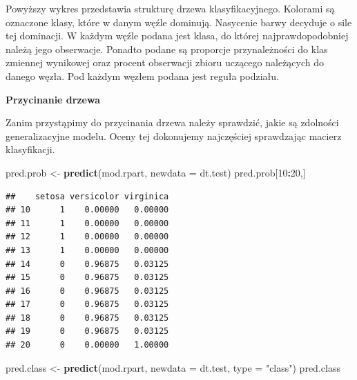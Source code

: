 \documentclass[]{book}
\newenvironment{Shaded}{\begin{snugshade}}{\end{snugshade}}
\newcommand{\DataTypeTok}[1]{\textcolor[rgb]{0.13,0.29,0.53}{#1}}
\newcommand{\DecValTok}[1]{\textcolor[rgb]{0.00,0.00,0.81}{#1}}
\newcommand{\KeywordTok}[1]{\textcolor[rgb]{0.13,0.29,0.53}{\textbf{#1}}}
\newcommand{\NormalTok}[1]{#1}
\newcommand{\OperatorTok}[1]{\textcolor[rgb]{0.81,0.36,0.00}{\textbf{#1}}}
\newcommand{\StringTok}[1]{\textcolor[rgb]{0.31,0.60,0.02}{#1}}
\theoremstyle{plain}
\theoremstyle{definition}
\theoremstyle{definition}
\theoremstyle{definition}
\theoremstyle{definition}
\theoremstyle{remark}
\begin{document}
Powyższy wykres przedstawia strukturę drzewa klasyfikacyjnego. Kolorami są oznaczone klasy, które w danym węźle dominują. Nasycenie barwy decyduje o sile tej dominacji. W każdym węźle podana jest klasa, do której najprawdopodobniej należą jego obserwacje. Ponadto podane są proporcje przynależności do klas zmiennej wynikowej oraz procent obserwacji zbioru uczącego należących do danego węzła. Pod każdym węzłem podana jest reguła podziału.

\textbf{Przycinanie drzewa}

Zanim przystąpimy do przycinania drzewa należy sprawdzić, jakie są zdolności generalizacyjne modelu. Oceny tej dokonujemy najczęściej sprawdzając macierz klasyfikacji.

\begin{Shaded}
\begin{Highlighting}[]
\NormalTok{pred.prob <-}\StringTok{ }\KeywordTok{predict}\NormalTok{(mod.rpart, }
                     \DataTypeTok{newdata =}\NormalTok{ dt.test)}
\NormalTok{pred.prob[}\DecValTok{10}\OperatorTok{:}\DecValTok{20}\NormalTok{,]}
\end{Highlighting}
\end{Shaded}

\begin{verbatim}
##    setosa versicolor virginica
## 10      1    0.00000   0.00000
## 11      1    0.00000   0.00000
## 12      1    0.00000   0.00000
## 13      1    0.00000   0.00000
## 14      0    0.96875   0.03125
## 15      0    0.96875   0.03125
## 16      0    0.96875   0.03125
## 17      0    0.96875   0.03125
## 18      0    0.96875   0.03125
## 19      0    0.96875   0.03125
## 20      0    0.00000   1.00000
\end{verbatim}

\begin{Shaded}
\begin{Highlighting}[]
\NormalTok{pred.class <-}\StringTok{ }\KeywordTok{predict}\NormalTok{(mod.rpart, }
                      \DataTypeTok{newdata =}\NormalTok{ dt.test,}
                      \DataTypeTok{type =} \StringTok{"class"}\NormalTok{)}
\NormalTok{pred.class}
\end{Highlighting}
\end{Shaded}
\end{document}
